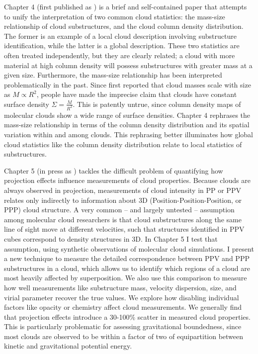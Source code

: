 Chapter 4 (first published as \citealt{Beaumont12}) is a brief and self-contained paper that attempts to unify the interpretation of two common cloud statistics: the mass-size relationship of cloud substructures, and the cloud column density distribution. The former is an example of a local cloud description involving substructure identification, while the latter is a global description. These two statistics are often treated independently, but they are clearly related; a cloud with more material at high column density will possess substructures with greater mass at a given size. Furthermore, the mass-size relationship has been interpreted problematically in the past. Since \cite{Larson81} first reported that cloud masses scale with size as $M \propto R^2$, people have made the imprecise claim that clouds have constant surface density $\Sigma = \frac{M}{R^2}$. This is patently untrue, since column density maps of molecular clouds show a wide range of surface densities. Chapter 4 rephrases the mass-size relationship in terms of the column density distribution and its spatial variation within and among clouds. This rephrasing better illuminates how global cloud statistics like the column density distribution relate to local statistics of substructures.

Chapter 5 (in press as \citealt{Beaumont13a}) tackles the difficult problem of quantifying how projection effects influence measurements of cloud properties. Because clouds are always observed in projection, measurements of cloud intensity in PP or PPV relates only indirectly to information about 3D (Position-Position-Position, or PPP) cloud structure. A very common -- and largely untested -- assumption among molecular cloud researchers is that cloud substructures along the same line of sight move at different velocities, such that structures identified in PPV cubes correspond to density structures in 3D. In Chapter 5 I test that assumption, using synthetic observations of molecular cloud simulations. I present a new technique to measure the detailed correspondence between PPV and PPP substructures in a cloud, which allows us to identify which regions of a cloud are most heavily affected by superposition. We also use this comparison to measure how well measurements like substructure mass, velocity dispersion, size, and virial parameter recover the true values. We explore how disabling individual factors like opacity or chemistry affect cloud measurements. We generally find that projection effects introduce a 30-100\% scatter in measured cloud properties. This is particularly problematic for assessing gravitational boundedness, since most clouds are observed to be within a factor of two of equipartition between kinetic and gravitational potential energy. 


